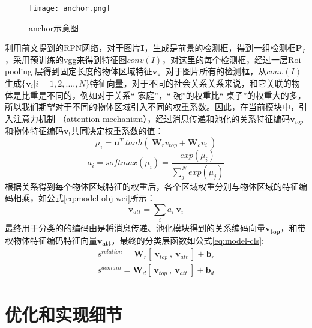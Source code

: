 \begin{figure}[htpb]
	\centering
	\texttt{[image: anchor.png]}
    \caption{anchor示意图}
	\vspace*{-3.5mm}
	\label{fig:anchor}
\end{figure}

利用前文提到的RPN网络，对于图片$\bm{I}$，生成是前景的检测框，得到一组检测框$\bm{P}_{I}$，采用预训练的vgg来得到特征图$conv(I)$，对这里的每个检测框，经过一层Roi pooling 层得到固定长度的物体区域特征$\mathbf{v}$。对于图片所有的检测框，从$conv(I)$生成$\{ \mathbf{v}_{i}|i=1,2,....,N\}$特征向量，对于不同的社会关系关系来说，和它关联的物体是比重是不同的，例如对于关系`` 家庭''，`` 碗''的权重比`` 桌子''的权重大的多，所以我们期望对于不同的物体区域引入不同的权重系数。因此，在当前模块中，引入注意力机制
（attention mechanism），经过消息传递和池化的关系特征编码$\mathbf{v}_{top}$和物体特征编码$\mathbf{v_{i}}$共同决定权重系数的值：
\begin{equation}
    \mu_{i} = \mathbf{u}^{T}~tanh(~\mathbf{W}_{r}v_{top}+\mathbf{W}_{o}v_{i}~)
\end{equation}
\begin{equation}
    a_{i} = softmax(\mu_i) = \frac{exp(\mu_{i})}{\sum_{j}^{N}exp(\mu_{j})}
\end{equation}
根据关系得到每个物体区域特征的权重后，各个区域权重分别与物体区域的特征编码相乘，如公式\ref{eq:model-obj-wei}所示：
\begin{equation}
    \label{eq:model-obj-wei}
    \mathbf{v}_{att} = \sum_{i}a_{i}~\mathbf{v}_{i}
\end{equation}
最终用于分类的的编码由是将消息传递、池化模块得到的关系编码向量$\mathbf{v_{top}}$，和带权物体特征编码特征向量$\mathbf{v_{att}}$，最终的分类层函数如公式\ref{eq:model-cls}:
\begin{equation}
    \label{eq:model-cls}
    \begin{split}
    s^{relation} = \mathbf{W}_{r}[~\mathbf{v}_{top}~,~\mathbf{v}_{att}~] + \mathbf{b}_r \\
    s^{domain} = \mathbf{W}_{d}[~\mathbf{v}_{top}~,~\mathbf{v}_{att}~] + \mathbf{b}_d
    \end{split}
\end{equation}

\section{优化和实现细节}

